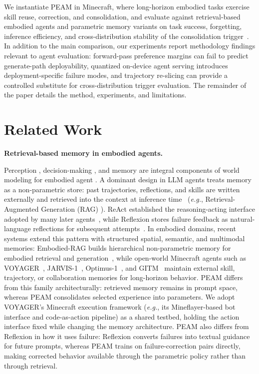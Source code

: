 \documentclass[11pt]{article}
\begin{document}
We instantiate PEAM in Minecraft, where long-horizon embodied tasks exercise skill reuse, correction, and consolidation, and evaluate against retrieval-based embodied agents and parametric memory variants on task success, forgetting, inference efficiency, and cross-distribution stability of the consolidation trigger~\cite{wang2023voyager}. In addition to the main comparison, our experiments report methodology findings relevant to agent evaluation: forward-pass preference margins can fail to predict generate-path deployability, quantized on-device agent serving introduces deployment-specific failure modes, and trajectory re-slicing can provide a controlled substitute for cross-distribution trigger evaluation. The remainder of the paper details the method, experiments, and limitations.



\section{Related Work}

\noindent\textbf{Retrieval-based memory in embodied agents.}

\noindent Perception \cite{guo2026adding}, decision-making \cite{savva2026solaris}, and memory \cite{du2026memory} are integral components of world modeling for embodied agent \cite{liu2026gamma, guo2026can}. A dominant design in LLM agents treats memory as a non-parametric store: past trajectories, reflections, and skills are written externally and retrieved into the context at inference time~\cite{du2026memory, hu2025memory, zhang2025survey} (\textit{e.g.}, Retrieval-Augmented Generation (RAG) \cite{guo2026lumivideo}). ReAct established the reasoning-acting interface adopted by many later agents~\cite{yao2022react}, while Reflexion stores failure feedback as natural-language reflections for subsequent attempts~\cite{shinn2023reflexion}. In embodied domains, recent systems extend this pattern with structured spatial, semantic, and multimodal memories: Embodied-RAG builds hierarchical non-parametric memory for embodied retrieval and generation~\cite{xie2024embodied}, while open-world Minecraft agents such as VOYAGER~\cite{wang2023voyager}, JARVIS-1~\cite{wang2024jarvis}, Optimus-1~\cite{li2024optimus}, and GITM~\cite{zhu2023ghost} maintain external skill, trajectory, or collaboration memories for long-horizon behavior. PEAM differs from this family architecturally: retrieved memory remains in prompt space, whereas PEAM consolidates selected experience into parameters. We adopt VOYAGER's Minecraft execution framework (\textit{e.g.}, its Mineflayer-based bot interface and code-as-action pipeline) as a shared testbed, holding the action interface fixed while changing the memory architecture. PEAM also differs from Reflexion in how it uses failure: Reflexion converts failures into textual guidance for future prompts, whereas PEAM trains on failure-correction pairs directly, making corrected behavior available through the parametric policy rather than through retrieval.
\end{document}
